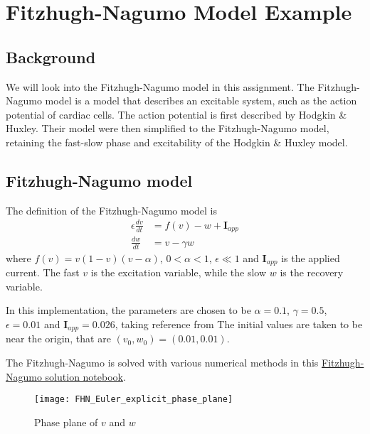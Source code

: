 \chapter{Fitzhugh-Nagumo Model Example}
\label{chap:fitzhugh-nagumo}
\section{Background}
We will look into the Fitzhugh-Nagumo model in this assignment. The Fitzhugh-Nagumo model is a model that describes an excitable system, such as the action potential of cardiac cells. The action potential is first described by Hodgkin \& Huxley. Their model were then simplified to the Fitzhugh-Nagumo model, retaining the fast-slow phase and excitability of the Hodgkin \& Huxley model. %

\section{Fitzhugh-Nagumo model}
The definition of the Fitzhugh-Nagumo model is
\begin{align}
    \epsilon \frac{dv}{dt} &= f(v) - w + \mathbf{I}_{app} \\
    \frac{dw}{dt} &= v - \gamma w
\end{align}
where $f(v) = v(1-v)(v-\alpha)$, $0 < \alpha < 1$, $\epsilon \ll 1$ and $\mathbf{I}_{app}$ is the applied current. The fast $v$ is the excitation variable, while the slow $w$ is the recovery variable.

In this implementation, the parameters are chosen to be $\alpha = 0.1$, $\gamma = 0.5$, $\epsilon = 0.01$ and $\mathbf{I}_{app} = 0.026$, taking reference from %
The initial values are taken to be near the origin, that are $(v_0, w_0) = (0.01, 0.01)$. 

The Fitzhugh-Nagumo is solved with various numerical methods in this \href{https://nbviewer.jupyter.org/github/FarmHJ/numerical-solver/blob/main/examples/fitzhugh_nagumo.ipynb}{Fitzhugh-Nagumo solution notebook}. 

\begin{figure}
    \texttt{[image: FHN\_Euler\_explicit\_phase\_plane]}
    \caption{Phase plane of $v$ and $w$}
    \label{fig:Euler_explicit_phase_plane}
\end{figure}

